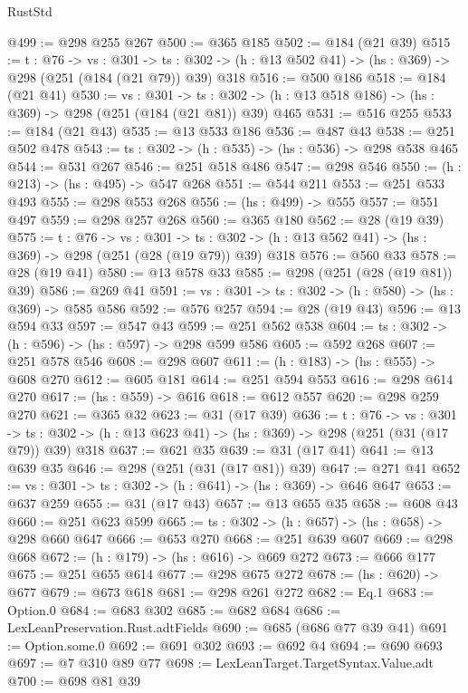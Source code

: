 \begin{lexlean}{RustStd}
\begin{coremodule}
{\begin{coremodule}
{@499 := @298 @255 @267
@500 := @365 @185
@502 := @184 (@21 @39)
@515 := {t : @76} ->
  {vs : @301} ->
  {ts : @302} -> (h : @13 @502 @41) -> (hs : @369) -> @298 (@251 (@184 (@21 @79)) @39) @318
@516 := @500 @186
@518 := @184 (@21 @41)
@530 := {vs : @301} ->
  {ts : @302} -> (h : @13 @518 @186) -> (hs : @369) -> @298 (@251 (@184 (@21 @81)) @39) @465
@531 := @516 @255
@533 := @184 (@21 @43)
@535 := @13 @533 @186
@536 := @487 @43
@538 := @251 @502 @478
@543 := {ts : @302} -> (h : @535) -> (hs : @536) -> @298 @538 @465
@544 := @531 @267
@546 := @251 @518 @486
@547 := @298 @546
@550 := (h : @213) -> (hs : @495) -> @547 @268
@551 := @544 @211
@553 := @251 @533 @493
@555 := @298 @553 @268
@556 := (hs : @499) -> @555
@557 := @551 @497
@559 := @298 @257 @268
@560 := @365 @180
@562 := @28 (@19 @39)
@575 := {t : @76} ->
  {vs : @301} ->
  {ts : @302} -> (h : @13 @562 @41) -> (hs : @369) -> @298 (@251 (@28 (@19 @79)) @39) @318
@576 := @560 @33
@578 := @28 (@19 @41)
@580 := @13 @578 @33
@585 := @298 (@251 (@28 (@19 @81)) @39)
@586 := @269 @41
@591 := {vs : @301} -> {ts : @302} -> (h : @580) -> (hs : @369) -> @585 @586
@592 := @576 @257
@594 := @28 (@19 @43)
@596 := @13 @594 @33
@597 := @547 @43
@599 := @251 @562 @538
@604 := {ts : @302} -> (h : @596) -> (hs : @597) -> @298 @599 @586
@605 := @592 @268
@607 := @251 @578 @546
@608 := @298 @607
@611 := (h : @183) -> (hs : @555) -> @608 @270
@612 := @605 @181
@614 := @251 @594 @553
@616 := @298 @614 @270
@617 := (hs : @559) -> @616
@618 := @612 @557
@620 := @298 @259 @270
@621 := @365 @32
@623 := @31 (@17 @39)
@636 := {t : @76} ->
  {vs : @301} ->
  {ts : @302} -> (h : @13 @623 @41) -> (hs : @369) -> @298 (@251 (@31 (@17 @79)) @39) @318
@637 := @621 @35
@639 := @31 (@17 @41)
@641 := @13 @639 @35
@646 := @298 (@251 (@31 (@17 @81)) @39)
@647 := @271 @41
@652 := {vs : @301} -> {ts : @302} -> (h : @641) -> (hs : @369) -> @646 @647
@653 := @637 @259
@655 := @31 (@17 @43)
@657 := @13 @655 @35
@658 := @608 @43
@660 := @251 @623 @599
@665 := {ts : @302} -> (h : @657) -> (hs : @658) -> @298 @660 @647
@666 := @653 @270
@668 := @251 @639 @607
@669 := @298 @668
@672 := (h : @179) -> (hs : @616) -> @669 @272
@673 := @666 @177
@675 := @251 @655 @614
@677 := @298 @675 @272
@678 := (hs : @620) -> @677
@679 := @673 @618
@681 := @298 @261 @272
@682 := Eq.{1}
@683 := Option.{0}
@684 := @683 @302
@685 := @682 @684
@686 := LexLeanPreservation.Rust.adtFields
@690 := @685 (@686 @77 @39 @41)
@691 := Option.some.{0}
@692 := @691 @302
@693 := @692 @4
@694 := @690 @693
@697 := @7 @310 @89 @77
@698 := LexLeanTarget.TargetSyntax.Value.adt
@700 := @698 @81 @39
}
\end{coremodule}}
\end{coremodule}
\end{lexlean}

